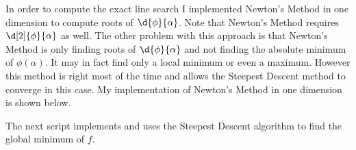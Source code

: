 \documentclass[11pt, oneside]{article}
\begin{document}
\begin{enumerate}
    In order to compute the exact line search I implemented Newton's Method in
    one dimension to compute roots of $\d{\phi}{\alpha}$.
    Note that Newton's Method requires $\d[2]{\phi}{\alpha}$ as well.
    The other problem with this approach is that Newton's Method is only
    finding roots of $\d{\phi}{\alpha}$ and not finding the absolute minimum of
    $\phi(\alpha)$.
    It may in fact find only a local minimum or even a maximum.
    However this method is right most of the time and allows the Steepest Descent
    method to converge in this case.
    My implementation of Newton's Method in one dimension is shown below.
    
    The next script implements and uses the Steepest Descent algorithm to find
    the global minimum of $f$.
    


\end{enumerate}
\end{document}
